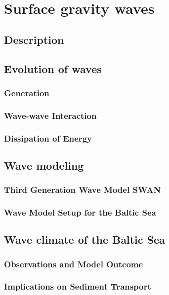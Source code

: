 \chapter{Surface gravity waves}
\label{kap-waves}

\section{Description}

\section{Evolution of waves}

\subsection{Generation}

\subsection{Wave-wave Interaction}

\subsection{Dissipation of Energy}

\section{Wave modeling}

\subsection{Third Generation Wave Model SWAN}

\subsection{Wave Model Setup for the Baltic Sea}

\section{Wave climate of the Baltic Sea}

\subsection{Observations and Model Outcome}

\subsection{Implications on Sediment Transport}